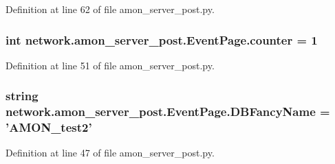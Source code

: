 Definition at line 62 of file amon\-\_\-server\-\_\-post.\-py.

\hypertarget{classnetwork_1_1amon__server__post_1_1_event_page_aa2d1165df8829699de38f4047d8d9b3c}{
\subsubsection[{counter}]{\setlength{\rightskip}{0pt plus 5cm}int network.\-amon\-\_\-server\-\_\-post.\-Event\-Page.\-counter = 1\hspace{0.3cm}{\ttfamily [static]}}}\label{classnetwork_1_1amon__server__post_1_1_event_page_aa2d1165df8829699de38f4047d8d9b3c}


Definition at line 51 of file amon\-\_\-server\-\_\-post.\-py.

\hypertarget{classnetwork_1_1amon__server__post_1_1_event_page_ab13a95bbc99fa0136f178e8dfb59a32d}{
\subsubsection[{D\-B\-Fancy\-Name}]{\setlength{\rightskip}{0pt plus 5cm}string network.\-amon\-\_\-server\-\_\-post.\-Event\-Page.\-D\-B\-Fancy\-Name = '{\bf A\-M\-O\-N\-\_\-test2}'\hspace{0.3cm}{\ttfamily [static]}}}\label{classnetwork_1_1amon__server__post_1_1_event_page_ab13a95bbc99fa0136f178e8dfb59a32d}


Definition at line 47 of file amon\-\_\-server\-\_\-post.\-py.

